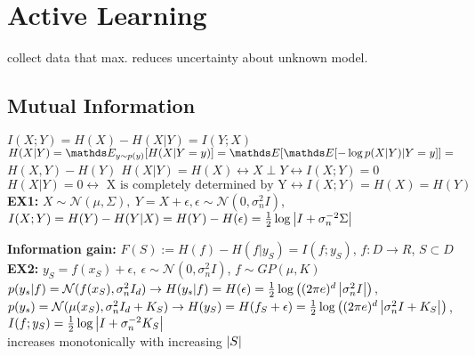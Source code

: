 \section{Active Learning}
collect data that max. reduces uncertainty about unknown model.

\subsection{Mutual Information}
$I(X;Y)=H(X)-H(X|Y)=I(Y;X)$\\
$H(X|Y) = \E[y \sim p(y)]{H(X|Y=y)} = \E{\E{-\log p(X|Y)|Y=y}} =$
$H(X,Y) - H(Y)$
$ H(X|Y) = H(X) \leftrightarrow X \perp Y \leftrightarrow I(X;Y) = 0$\\
$H(X|Y)=0 \leftrightarrow \text{ X is completely determined by Y} \leftrightarrow  I(X;Y) = H(X) = H(Y)$\\
\textbf{EX1:} $X \sim \mathcal{N}(\mu, \Sigma),\ Y=X+\epsilon,
\epsilon \sim \mathcal{N}(0, \sigma_{n}^{2}I)$,
$I(X;Y)=H(Y)-H(Y|X) = H(Y)-H(\epsilon) = \frac{1}{2} \log \left\lvert I+ \sigma_{n}^{-2}\Sigma\right\rvert$

\textbf{Information gain:}
$F(S) := H(f)-H(f|y_{S}) = I(f;y_{S})$, $f: D \rightarrow R$, $S \subset D$\\
\textbf{\color{orange} EX2:}\color{black} $y_{S} = f(x_{S}) + \epsilon,\ \epsilon \sim \mathcal{N}(0, \sigma_{n}^{2}I)$, $f \sim GP(\mu, K)$
$p(y_{s}|f) = \mathcal{N}(f(x_{S}), \sigma_{n}^{2} I_{d})
\rightarrow H(y_{s}|f) = H(\epsilon)= \frac{1}{2}\log \left((2\pi e)^{d} \left\lvert\sigma_{n}^{2}I\right\rvert\right)$,
$p(y_{s}) = \mathcal{N}(\mu(x_{S}), \sigma_{n}^{2} I_{d} + K_{S})
\rightarrow H(y_{S}) = H(f_{S} + \epsilon) =\frac{1}{2}\log \left((2\pi e)^{d} \left\lvert\sigma_{n}^{2}I + K_{S}\right\rvert\right)$,
$I(f;y_{S}) = \frac{1}{2} \log \left\lvert I+ \sigma_{n}^{-2} K_{S}\right\rvert$\\
increases monotonically with increasing $\left\lvert S\right\rvert$

